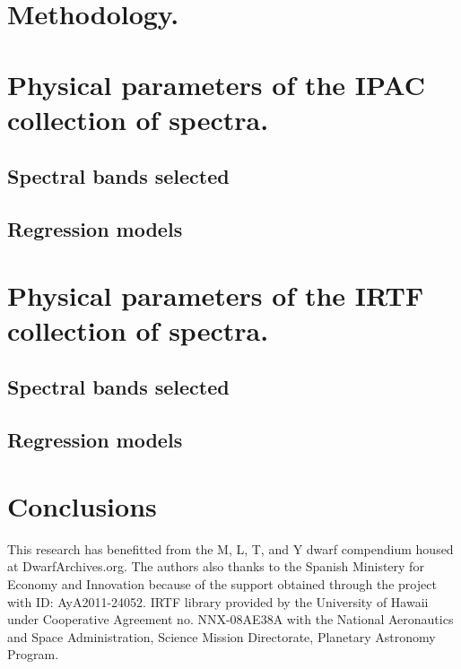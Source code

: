 \documentclass[referee]{aa}
\begin{document}




\section{Methodology.}


\section{Physical parameters of the IPAC collection of spectra.}
%
\subsection{Spectral bands selected}
%
\subsection{Regression models}
%

\section{Physical parameters of the IRTF collection of spectra.}
%
\subsection{Spectral bands selected}

\subsection{Regression models}


\section{Conclusions}

\begin{acknowledgements}
This research has benefitted from the M, L, T, and Y dwarf compendium housed at DwarfArchives.org.
The authors also thanks to the Spanish Ministery for Economy and Innovation because of the 
support obtained through the project with ID: AyA2011-24052. IRTF library provided by the 
University of Hawaii under Cooperative Agreement no. NNX-08AE38A with the National 
Aeronautics and Space Administration, Science Mission Directorate, Planetary Astronomy Program.
\end{acknowledgements}


{}

\end{document}
